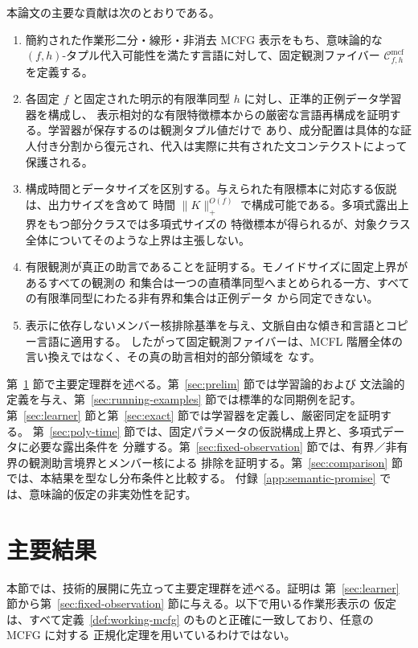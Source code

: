 \documentclass[11pt,a4paper]{ltjsarticle}
\theoremstyle{remark}
\newcommand{\Cmcf}[2]{\mathcal{C}^{\mathrm{mcf}}_{#1,#2}}
\begin{document}
本論文の主要な貢献は次のとおりである。
\begin{enumerate}[label=(\roman*),leftmargin=*]
\item 簡約された作業形二分・線形・非消去 MCFG 表示をもち、意味論的な
\((f,h)\)-タプル代入可能性を満たす言語に対して、固定観測ファイバー
\(\Cmcf{f}{h}\) を定義する。

\item 各固定 \(f\) と固定された明示的有限準同型 \(h\) に対し、正準的正例データ学習器を構成し、
表示相対的な有限特徴標本からの厳密な言語再構成を証明する。学習器が保存するのは観測タプル値だけで
あり、成分配置は具体的な証人付き分割から復元され、代入は実際に共有された文コンテクストによって
保護される。

\item 構成時間とデータサイズを区別する。与えられた有限標本に対応する仮説は、出力サイズを含めて
時間 \(\|K\|_+^{O(f)}\) で構成可能である。多項式露出上界をもつ部分クラスでは多項式サイズの
特徴標本が得られるが、対象クラス全体についてそのような上界は主張しない。

\item 有限観測が真正の助言であることを証明する。モノイドサイズに固定上界があるすべての観測の
和集合は一つの直積準同型へまとめられる一方、すべての有限準同型にわたる非有界和集合は正例データ
から同定できない。

\item 表示に依存しないメンバー核排除基準を与え、文脈自由な傾き和言語とコピー言語に適用する。
したがって固定観測ファイバーは、MCFL 階層全体の言い換えではなく、その真の助言相対的部分領域を
なす。
\end{enumerate}

第~\ref{sec:main-results} 節で主要定理群を述べる。第~\ref{sec:prelim} 節では学習論的および
文法論的定義を与え、第~\ref{sec:running-examples} 節では標準的な同期例を記す。
第~\ref{sec:learner} 節と第~\ref{sec:exact} 節では学習器を定義し、厳密同定を証明する。
第~\ref{sec:poly-time} 節では、固定パラメータの仮説構成上界と、多項式データに必要な露出条件を
分離する。第~\ref{sec:fixed-observation} 節では、有界／非有界の観測助言境界とメンバー核による
排除を証明する。第~\ref{sec:comparison} 節では、本結果を型なし分布条件と比較する。
付録~\ref{app:semantic-promise} では、意味論的仮定の非実効性を記す。

\section{主要結果}
\label{sec:main-results}

本節では、技術的展開に先立って主要定理群を述べる。証明は
第~\ref{sec:learner} 節から第~\ref{sec:fixed-observation} 節に与える。以下で用いる作業形表示の
仮定は、すべて定義~\ref{def:working-mcfg} のものと正確に一致しており、任意の MCFG に対する
正規化定理を用いているわけではない。
\end{document}
